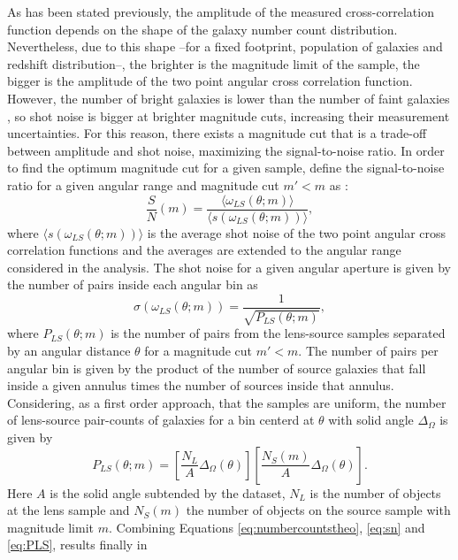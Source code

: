 As has been stated previously, the amplitude of the measured cross-correlation function depends on the shape of the galaxy number count distribution. Nevertheless, due to this shape --for a fixed footprint, population of galaxies and redshift distribution--, the brighter is the magnitude limit of the sample, the bigger is the amplitude of the two point angular cross correlation function. However, the number of bright galaxies is lower than the number of faint galaxies \cite{1976ApJ...203..297S}, so shot noise is bigger at brighter magnitude cuts, increasing their measurement uncertainties. For this reason, there exists a magnitude cut that is a trade-off between amplitude and shot noise, maximizing the signal-to-noise ratio.  In  order to find the optimum magnitude cut for a given sample, define the signal-to-noise ratio for a given angular range  and magnitude cut $m'<m$ as \cite{1998MNRAS.294L..18M}:
\begin{equation}
\frac{S}{N}(m) = \frac{\langle \omega_{LS}(\theta;m)\rangle}{\langle s(\omega_{LS}(\theta;m))\rangle},
\label{eq:sn}
\end{equation}
where $\langle s(\omega_{LS}(\theta;m))\rangle$ is the average shot noise of the two point angular cross correlation functions and the averages are extended to the angular range considered in the analysis. The shot noise for a given angular aperture is given by the number of pairs inside each angular bin as
\begin{equation}
\sigma(\omega_{LS}(\theta;m)) = \frac{1}{\sqrt{P_{LS}(\theta;m)}},
\end{equation}
where $P_{LS}(\theta;m)$ is the number of pairs from the lens-source samples separated by an angular distance $\theta$ for a magnitude cut $m '<m$. The number of pairs per angular bin is given by the product of the number of source galaxies that fall inside a given annulus times the number of sources inside that annulus. Considering, as a first order approach, that the samples are uniform, the number of lens-source pair-counts of galaxies for a bin centerd at $\theta$ with solid angle $\Delta_\Omega$ is given by
\begin{equation}
P_{LS}(\theta;m) = \left[\frac{N_L}{A}\Delta_\Omega(\theta)\right]\left[\frac{N_S(m)}{A}\Delta_\Omega(\theta)\right].
\label{eq:PLS}
\end{equation}
Here $A$ is the solid angle subtended by the dataset, $N_L$ is the number of objects at the lens sample and $N_S(m)$ the number of objects on the source sample with magnitude limit $m$. Combining Equations \ref{eq:numbercountstheo}, \ref{eq:sn} and \ref{eq:PLS}, results finally in
